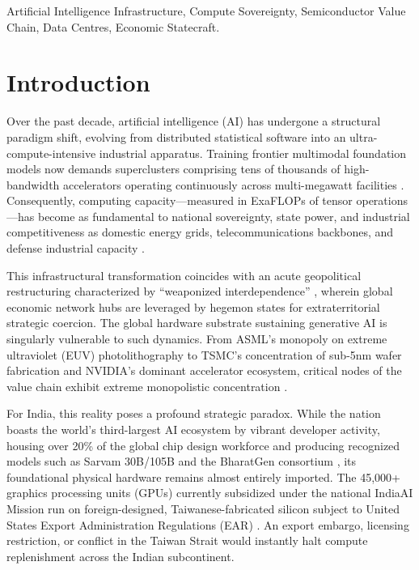 \documentclass[conference,a4paper]{IEEEtran}
\begin{document}
\begin{IEEEkeywords}
Artificial Intelligence Infrastructure, Compute Sovereignty, Semiconductor Value Chain, Data Centres, Economic Statecraft.
\end{IEEEkeywords}

\section{Introduction}
Over the past decade, artificial intelligence (AI) has undergone a structural paradigm shift, evolving from distributed statistical software into an ultra-compute-intensive industrial apparatus. Training frontier multimodal foundation models now demands superclusters comprising tens of thousands of high-bandwidth accelerators operating continuously across multi-megawatt facilities \cite{geopoliticscompute2026}. Consequently, computing capacity—measured in ExaFLOPs of tensor operations—has become as fundamental to national sovereignty, state power, and industrial competitiveness as domestic energy grids, telecommunications backbones, and defense industrial capacity \cite{sastry2024governance, pau2025sovereignty}.

This infrastructural transformation coincides with an acute geopolitical restructuring characterized by ``weaponized interdependence'' \cite{farrell2019weaponized}, wherein global economic network hubs are leveraged by hegemon states for extraterritorial strategic coercion. The global hardware substrate sustaining generative AI is singularly vulnerable to such dynamics. From ASML's monopoly on extreme ultraviolet (EUV) photolithography to TSMC's concentration of sub-5nm wafer fabrication and NVIDIA's dominant accelerator ecosystem, critical nodes of the value chain exhibit extreme monopolistic concentration \cite{akimitsu2026supply, miller2022chipwar}.

For India, this reality poses a profound strategic paradox. While the nation boasts the world's third-largest AI ecosystem by vibrant developer activity, housing over 20\% of the global chip design workforce and producing recognized models such as Sarvam 30B/105B and the BharatGen consortium \cite{stanford_hai2025, meity2026semicon}, its foundational physical hardware remains almost entirely imported. The 45,000+ graphics processing units (GPUs) currently subsidized under the national IndiaAI Mission run on foreign-designed, Taiwanese-fabricated silicon subject to United States Export Administration Regulations (EAR) \cite{thakker2026sovereign, cetas2026semicon}. An export embargo, licensing restriction, or conflict in the Taiwan Strait would instantly halt compute replenishment across the Indian subcontinent.
\end{document}
